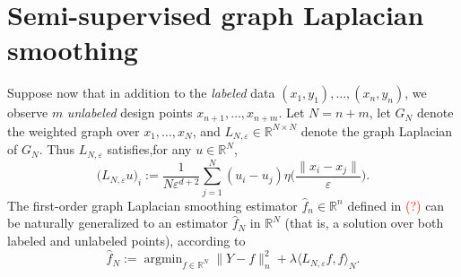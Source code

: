 \documentclass{article}
\newcommand{\Reals}{\mathbb{R}}
\newcommand{\1}{\mathbf{1}}
\DeclareMathOperator*{\argmin}{argmin}
\newcommand{\dotp}[2]{\langle #1, #2 \rangle}
\newcommand{\wh}[1]{\widehat{#1}}
\theoremstyle{alden}
\theoremstyle{aldenthm}
\theoremstyle{definition}
\theoremstyle{remark}
\begin{document}
\section{Semi-supervised graph Laplacian smoothing}

Suppose now that in addition to the \emph{labeled} data $(x_1,y_1),\ldots,(x_n,y_n)$, we observe $m$ \emph{unlabeled} design points $x_{n + 1},\ldots,x_{n + m}$. Let $N = n + m$, let $G_{N}$ denote the weighted graph over $x_1,\ldots,x_N$, and $L_{N,\varepsilon} \in \Reals^{N \times N}$ denote the graph Laplacian of $G_{N}$. Thus $L_{N,\varepsilon}$ satisfies,for any $u \in \Reals^N$,
\begin{equation}
\label{eqn:graph_laplacian_all}
\bigl(L_{N,\varepsilon}u\bigr)_i := \frac{1}{N \varepsilon^{d + 2}}\sum_{j = 1}^{N} (u_i - u_j) \eta\biggl(\frac{\|x_i - x_j\|}{\varepsilon}\biggr).
\end{equation}
The first-order graph Laplacian smoothing estimator $\wh{f}_n \in \Reals^n$ defined in \textcolor{red}{(?)} can be naturally generalized to an estimator $\wh{f}_N$ in $\Reals^N$ (that is, a solution over both labeled and unlabeled points), according to
\begin{equation}
\label{eqn:ssl_graph_laplacian_smoothing_0}
\wh{f}_N := \argmin_{f \in \Reals^N} \|Y - f\|_n^2 + \lambda \dotp{L_{N,\varepsilon}f}{f}_N.
\end{equation}
\end{document}
